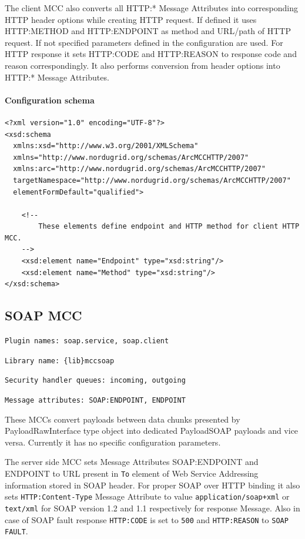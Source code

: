 \documentclass{book}
\begin{document}
The client MCC also converts all HTTP:* Message Attributes into corresponding HTTP header options while creating HTTP request. If defined it uses HTTP:METHOD and HTTP:ENDPOINT as method and URL/path of HTTP request. If not specified parameters defined in the configuration are used. For HTTP response it sets HTTP:CODE and HTTP:REASON to response code and reason correspondingly. It also performs conversion from header options into HTTP:* Message Attributes.

\paragraph{Configuration schema}

\begin{verbatim}
<?xml version="1.0" encoding="UTF-8"?>
<xsd:schema
  xmlns:xsd="http://www.w3.org/2001/XMLSchema"
  xmlns="http://www.nordugrid.org/schemas/ArcMCCHTTP/2007"
  xmlns:arc="http://www.nordugrid.org/schemas/ArcMCCHTTP/2007"
  targetNamespace="http://www.nordugrid.org/schemas/ArcMCCHTTP/2007"
  elementFormDefault="qualified">

    <!--
        These elements define endpoint and HTTP method for client HTTP MCC.
    -->
    <xsd:element name="Endpoint" type="xsd:string"/>
    <xsd:element name="Method" type="xsd:string"/>
</xsd:schema>
\end{verbatim}


\subsection{SOAP MCC}

\texttt{Plugin names: soap.service, soap.client}

\texttt{Library name: \{lib\}mccsoap}

\texttt{Security handler queues: incoming, outgoing}

\texttt{Message attributes: SOAP:ENDPOINT, ENDPOINT}


These MCCs convert payloads between data chunks presented by PayloadRawInterface type object into dedicated PayloadSOAP payloads and vice versa. Currently it has no specific configuration parameters.

The server side MCC sets Message Attributes SOAP:ENDPOINT and ENDPOINT to URL present in \texttt{To} element of Web Service Addressing information stored in SOAP header. For proper SOAP over HTTP binding it also sets \texttt{HTTP:Content-Type} Message Attribute to value \texttt{application/soap+xml} or \texttt{text/xml} for SOAP version 1.2 and 1.1 respectively for response Message. Also in case of SOAP fault response \texttt{HTTP:CODE} is set to \texttt{500} and \texttt{HTTP:REASON} to \texttt{SOAP FAULT}.
\end{document}
